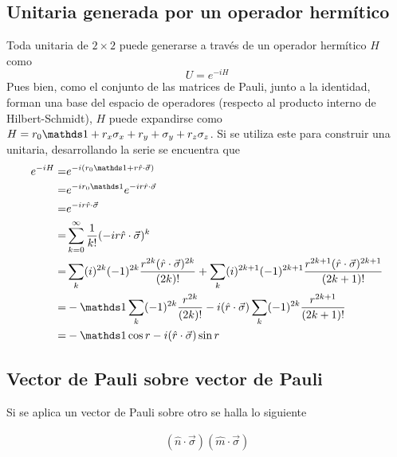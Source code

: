 \subsection{Unitaria generada por un operador hermítico}
Toda unitaria de $2\times 2$ puede generarse a través de un operador hermítico $H$ como
\begin{equation*}
    U=e^{-iH}
\end{equation*}
Pues bien, como el conjunto de las matrices de Pauli, junto a la identidad, forman una base del espacio de operadores (respecto al producto interno de Hilbert-Schmidt), $H$ puede expandirse como $H=r_{0}\Id+r_{x}\pauli{x}+r_{y}+\pauli{y}+r_{z}\pauli{z}$. Si se utiliza este para construir una unitaria, desarrollando la serie se encuentra que
\begin{align*}
    e^{-iH}=&e^{-i(r_{0}\Id+r\paulivec{r})}\\
    =&e^{-i r_{0}\Id}e^{-ir\paulivec{r}}\\
    =&e^{-ir\paulivec{r}}\\
    =&\sum_{k=0}^{\infty}\frac{1}{k!}(-ir\paulivec{r})^k\\
    =&\sum_{k}(i)^{2k}(-1)^{2k}\frac{r^{2k}(\paulivec{r})^{2k}}{(2k)!}+\sum_{k}(i)^{2k+1}(-1)^{2k+1}\frac{r^{2k+1}(\paulivec{r})^{2k+1}}{(2k+1)!}\\
    =&-\Id\sum_{k}(-1)^{2k}\frac{r^{2k}}{(2k)!}-i(\paulivec{r})\sum_{k}(-1)^{2k}\frac{r^{2k+1}}{(2k+1)!}\\
    =&-\Id \cos{r}-i(\paulivec{r})\sin{r}
\end{align*}
\subsection{Vector de Pauli sobre vector de Pauli}
Si se aplica un vector de Pauli sobre otro se halla lo siguiente

\begin{align*}
    (\hat{n}\cdot\vec{\sigma})(\hat{m}\cdot\vec{\sigma})
\end{align*}